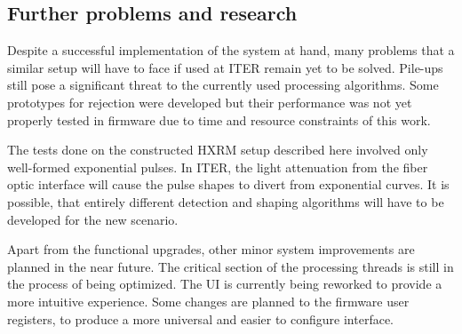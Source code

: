 \subsection{Further problems and research}

Despite a successful implementation of the system at hand, 
many problems that a similar setup will have to face
if used at ITER remain yet to be solved.
Pile-ups still pose a significant threat to the currently used processing algorithms. 
Some prototypes for rejection
were developed but their performance was not yet properly tested in firmware
due to time and resource constraints of this work.


The tests done on the constructed HXRM setup described here
involved only well-formed exponential pulses.
In ITER, the light attenuation from the fiber optic interface
will cause the pulse shapes to divert from exponential curves.
It is possible, that entirely different detection and shaping
algorithms will have to be developed for the new scenario. 


Apart from the functional upgrades, other minor system improvements are planned
in the near future. The critical section of the processing threads
is still in the process of being optimized. The UI is currently 
being reworked to provide a more intuitive experience. 
Some changes are planned to the firmware user registers, to produce
a more universal and easier to configure interface.


